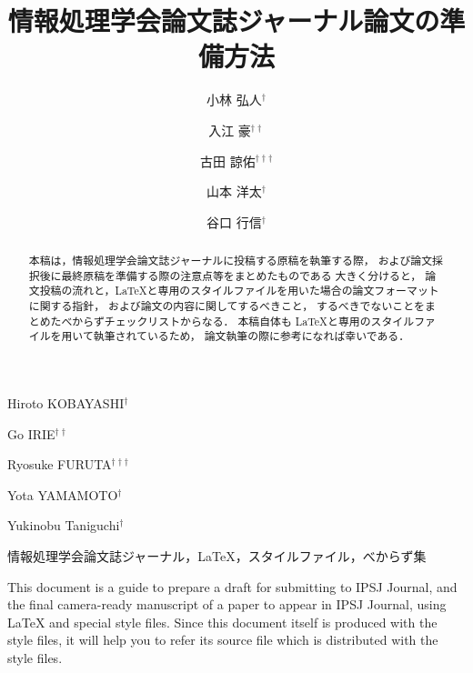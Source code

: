 \documentclass[submit]{ipsj}
\begin{document}
\title{情報処理学会論文誌ジャーナル論文の準備方法}

\author{小林 弘人$^{\dag}$}{Hiroto KOBAYASHI$^{\dag}$}{}
\author{入江 豪$^{\dag\dag}$}{Go IRIE$^{\dag\dag}$}{}
\author{古田 諒佑$^{\dag\dag\dag}$}{Ryosuke FURUTA$^{\dag\dag\dag}$}{}
\author{山本 洋太$^{\dag}$}{Yota YAMAMOTO$^{\dag}$}{}
\author{谷口 行信$^{\dag}$}{Yukinobu Taniguchi$^{\dag}$}{} 


\begin{abstract}
本稿は，情報処理学会論文誌ジャーナルに投稿する原稿を執筆する際，
および論文採択後に最終原稿を準備する際の注意点等をまとめたものである
大きく分けると，
論文投稿の流れと，\LaTeX と専用のスタイルファイルを用いた場合の論文フォーマットに関する指針，
および論文の内容に関してするべきこと，
するべきでないことをまとめたべからずチェックリストからなる．
本稿自体も \LaTeX と専用のスタイルファイルを用いて執筆されているため，
論文執筆の際に参考になれば幸いである．
\end{abstract}

\begin{jkeyword}
情報処理学会論文誌ジャーナル，\LaTeX，スタイルファイル，べからず集
\end{jkeyword}

\begin{eabstract}
This document is a guide to prepare a draft for submitting to IPSJ
Journal, and the final camera-ready manuscript of a paper to appear in
IPSJ Journal, using {\LaTeX} and special style files.  Since this
document itself is produced with the style files, it will help you to
refer its source file which is distributed with the style files.
\end{eabstract}
\end{document}
